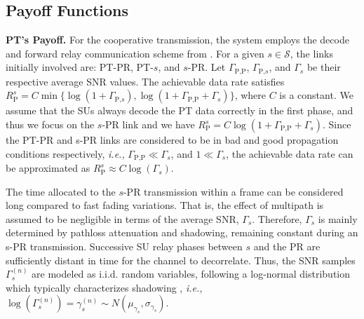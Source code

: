 \subsection {Payoff Functions}

\textbf{PT's Payoff.} For the cooperative transmission, the system employs the decode and forward relay communication scheme from \cite{ref:Laneman2001}. 
For a given $s\in\mathcal{S}$, the links initially involved are: PT-PR, PT-$s$, and $s$-PR. Let $\Gamma_{\text{P,P}}$, $\Gamma_{\text{P,}s}$, and $\Gamma_{s}$ be their respective average SNR values.
The achievable data rate satisfies
$R_{\text{P}}^{s} = C\min\{\log(1+\Gamma_{\text{P,}s}),\log(1+\Gamma_{\text{P,P}}+\Gamma_{s})\}$, where $C$ is a constant.
We assume that the SUs always decode the PT data correctly in the first phase, and thus we focus on the $s$-PR link and 
we have 
$R_{\text{P}}^{s} = C\log(1+\Gamma_{\text{P,P}}+\Gamma_{s})$.
Since the PT-PR and s-PR links are considered to be in bad and good propagation conditions respectively, \textit{i.e.,} $\Gamma_{\text{P,P}}\ll\Gamma_{s}$, and $1 \ll\Gamma_{s}$, the achievable data rate can be approximated as
$R_{\text{P}}^{s} \approx C\log(\Gamma_{s})$.

The time allocated to the $s$-PR transmission within a frame can be considered long compared to fast fading variations. That is, the effect of multipath is assumed to be negligible in terms of the average SNR, $\Gamma_s$. Therefore, $\Gamma_s$ is mainly determined by pathloss attenuation and shadowing, remaining constant during an s-PR transmission. Successive SU relay phases between $s$ and the PR are sufficiently distant in time for the channel to decorrelate. Thus, the SNR samples $\Gamma_s^{(n)}$ are modeled as i.i.d. random variables, following a log-normal distribution which typically characterizes shadowing \cite{ref:Goldsmith2009}, \textit{i.e.,} $\log(\Gamma_s^{(n)})=\gamma_s^{(n)} \sim N(\mu_{\gamma_s},\sigma_{\gamma_s})$. 

